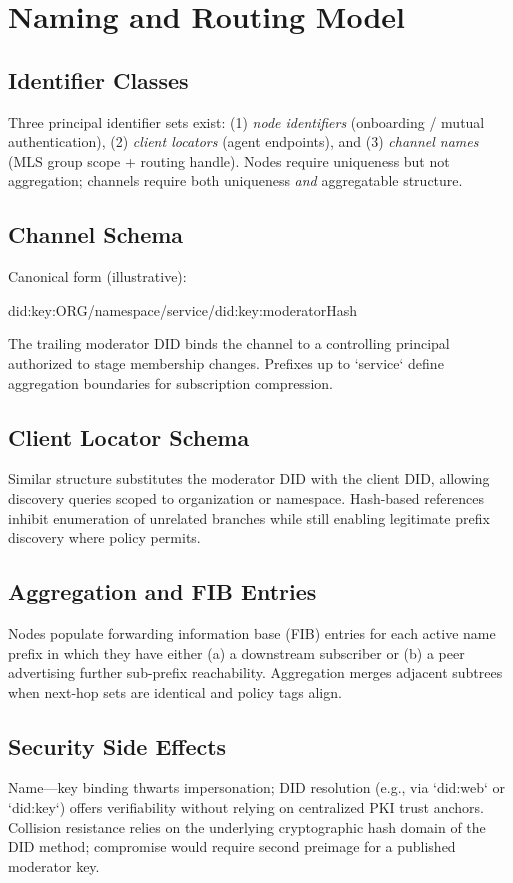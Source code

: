 \documentclass{article}
\theoremstyle{definition}
\theoremstyle{remark}
\begin{document}
\section{Naming and Routing Model}\label{sec:naming}
\subsection{Identifier Classes}
Three principal identifier sets exist: (1) \emph{node identifiers} (onboarding / mutual authentication), (2) \emph{client locators} (agent endpoints), and (3) \emph{channel names} (MLS group scope + routing handle). Nodes require uniqueness but not aggregation; channels require both uniqueness \emph{and} aggregatable structure.
\subsection{Channel Schema}
Canonical form (illustrative):
\begin{center}\ttfamily did:key:ORG/namespace/service/did:key:moderatorHash\end{center}
The trailing moderator DID binds the channel to a controlling principal authorized to stage membership changes. Prefixes up to `service` define aggregation boundaries for subscription compression.
\subsection{Client Locator Schema}
Similar structure substitutes the moderator DID with the client DID, allowing discovery queries scoped to organization or namespace. Hash-based references inhibit enumeration of unrelated branches while still enabling legitimate prefix discovery where policy permits.
\subsection{Aggregation and FIB Entries}
Nodes populate forwarding information base (FIB) entries for each active name prefix in which they have either (a) a downstream subscriber or (b) a peer advertising further sub-prefix reachability. Aggregation merges adjacent subtrees when next-hop sets are identical and policy tags align.
\subsection{Security Side Effects}
Name---key binding thwarts impersonation; DID resolution (e.g., via `did:web` or `did:key`) offers verifiability without relying on centralized PKI trust anchors. Collision resistance relies on the underlying cryptographic hash domain of the DID method; compromise would require second preimage for a published moderator key.
\end{document}
